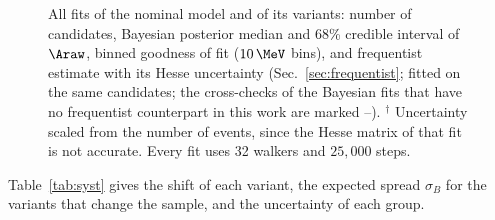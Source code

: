 \begin{figure}[!t]
\caption{All fits of the nominal model and of its variants: number of candidates, Bayesian posterior median and 68\% credible interval of $\Araw$, binned goodness of fit ($10\,\MeV$ bins), and frequentist estimate with its Hesse uncertainty (Sec.~\ref{sec:frequentist}; fitted on the same candidates; the cross-checks of the Bayesian fits that have no frequentist counterpart in this work are marked --). $^\dagger$ Uncertainty scaled from the number of events, since the Hesse matrix of that fit is not accurate. Every fit uses 32 walkers and $25{,}000$ steps.}
\label{tab:bayes_all}
\end{figure}

Table~\ref{tab:syst} gives the shift of each variant, the expected spread $\sigma_B$ for the variants that change the sample, and the uncertainty of each group.

